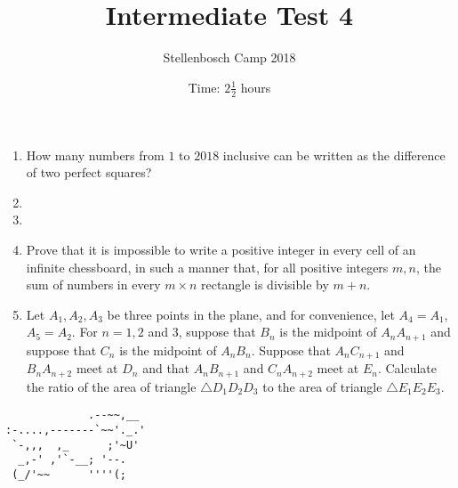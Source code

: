 \documentclass{article}
\title{Intermediate Test 4}
\author{Stellenbosch Camp 2018}
\date{Time: $2\frac{1}{2}$ hours}
\begin{document}
\maketitle

\begin{enumerate}[1.]

\item %
How many numbers from $1$ to $2018$ inclusive can be written as the difference of two perfect squares?


\vspace{12pt}
\item %


\vspace{12pt}
\item %


\vspace{12pt}
\item %
Prove that it is impossible to write a positive integer in every cell of an infinite chessboard, in such a manner that, for all positive integers $m, n$, the sum of numbers in every $m\times n$ rectangle is divisible by $m + n$.


\vspace{12pt}
\item %
Let $A_1, A_2, A_3$ be three points in the plane, and for convenience, let $A_4 = A_1$, $A_5 = A_2$. For $n = 1, 2$ and $3$, suppose that $B_n$ is the midpoint of $A_n A_{n+1}$ and suppose that $C_n$ is the midpoint of $A_n B_n$. Suppose that $A_n C_{n+1}$ and $B_n A_{n+2}$ meet at $D_n$ and that $A_n B_{n+1}$ and $C_n A_{n+2}$ meet at $E_n$. Calculate the ratio of the area of triangle $\triangle D_1 D_2 D_3$ to the area of triangle $\triangle E_1 E_2 E_3$.


\end{enumerate}


\vfill
\centering
\begin{BVerbatim}
             .--~~,__
:-....,-------`~~'._.'
 `-,,,  ,_      ;'~U'
  _,-' ,'`-__; '--.
 (_/'~~      ''''(;
\end{BVerbatim}
\end{document}
